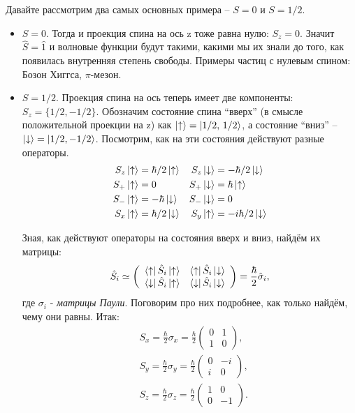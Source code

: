Давайте рассмотрим два самых основных примера -- $S = 0$ и $S = 1/2$.
\begin{itemize}
    \item $S = 0$. Тогда и проекция спина на ось z тоже равна нулю: $S_z = 0$. Значит $\hat{S} = \hat{1}$ и волновые функции будут такими, какими мы их знали до того, как появилась внутренняя степень свободы. Примеры частиц с нулевым спином: Бозон Хиггса, $\pi$-мезон.
    \item $S = 1/2$. Проекция спина на ось теперь имеет две компоненты: $S_z = \{1/2, -1/2\}$. Обозначим состояние спина ``вверх'' (в смысле положительной проекции на z) как $\ket{\uparrow} = \ket{1/2,\, 1/2}$, а состояние ``вниз'' -- $\ket{\downarrow} = \ket{1/2, -1/2}$. Посмотрим, как на эти состояния действуют разные операторы.
    \begin{align*}
        S_z&\ket{\uparrow} = \hbar/2\ket{\uparrow} & S_z&\ket{\downarrow} = -\hbar/2 \ket{\downarrow}\\
        S_+&\ket{\uparrow} = 0 & S_+&\ket{\downarrow} = \hbar\ket{\uparrow}\\
        S_-&\ket{\uparrow} = -\hbar\ket{\downarrow} & S_-&\ket{\downarrow} = 0\\
        S_x&\ket{\uparrow} =\hbar/2\ket{\downarrow} & S_y&\ket{\uparrow} =-i\hbar/2\ket{\downarrow}
    \end{align*}
    
    Зная, как действуют операторы на состояния вверх и вниз, найдём их матрицы:
    \[
    \hat{S}_i \simeq \left(\begin{array}{cc}
        \bra{\uparrow}\hat{S}_i\ket{\uparrow} & \bra{\uparrow}\hat{S}_i\ket{\downarrow} \\
        \bra{\downarrow}\hat{S}_i\ket{\uparrow}  & \bra{\downarrow}\hat{S}_i\ket{\downarrow}
    \end{array}
    \right) = \frac{\hbar}{2}\hat{\sigma}_i,
    \]
    где $\sigma_i$ - \textit{матрицы Паули}. Поговорим про них подробнее, как только найдём, чему они равны. Итак:
    \begin{align*}
    &S_x = \frac{\hbar}{2}\sigma_x = \frac{\hbar}{2}\left(\begin{array}{cc} 0 & 1\\ 1 & 0 \end{array}\right),\\
    &S_y = \frac{\hbar}{2}\sigma_y = \frac{\hbar}{2}\left(\begin{array}{cc} 0 & -i\\ i & 0 \end{array}\right),\\
    &S_z = \frac{\hbar}{2}\sigma_z = \frac{\hbar}{2}\left(\begin{array}{cc} 1 & 0\\ 0 & -1 \end{array}\right).
    \end{align*}
\end{itemize}

